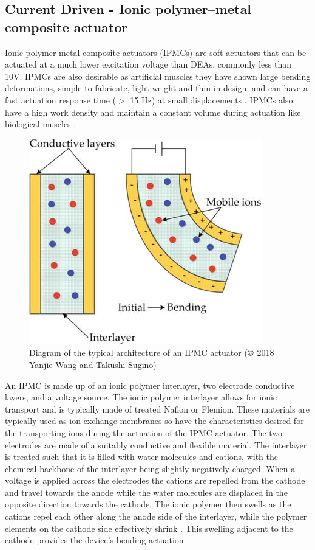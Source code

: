 \subsection{Current Driven - Ionic polymer–metal composite actuator}
Ionic polymer-metal composite actuators (IPMCs) are soft actuators that can be actuated at a much lower excitation voltage than DEAs, commonly less than 10V. IPMCs are also desirable as artificial muscles they have shown large bending deformations, simple to fabricate, light weight and thin in design, and can have a fast actuation response time ($>$ 15 Hz) at small displacements \citep{Ma2020}. IPMCs also have a high work density and maintain a constant volume during actuation like biological muscles \cite{Neuhaus2020}.
\begin{figure}[H]
  \centering
  \includegraphics[width=0.5\linewidth]{Figures/IPMC.png}
  \caption{Diagram of the typical architecture of an IPMC actuator \citep{Wang2018} ($\copyright$ 2018 Yanjie Wang and Takushi Sugino)}
  \label{fig:Artificial Muscle_IPMC}
\end{figure}
An IPMC is made up of an ionic polymer interlayer, two electrode conductive layers, and a voltage source. The ionic polymer interlayer allows for ionic transport and is typically made of treated Nafion or Flemion. These materials are typically used as ion exchange membranes so have the characteristics desired for the transporting ions during the actuation of the IPMC actuator. The two electrodes are made of a suitably conductive and flexible material. The interlayer is treated such that it is filled with water molecules and cations, with the chemical backbone of the interlayer being slightly negatively charged. When a voltage is applied across the electrodes the cations are repelled from the cathode and travel towards the anode while the water molecules are displaced in the opposite direction towards the cathode. The ionic polymer then swells as the cations repel each other along the anode side of the interlayer, while the polymer elements on the cathode side effectively shrink \citep{Segalman1999}. This swelling adjacent to the cathode provides the device's bending actuation.


